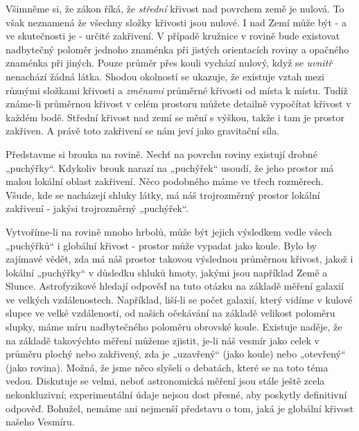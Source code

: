     Všimněme si, že zákon říká, že \emph{střední} křivost nad povrchem země je nulová. To však 
    neznamená že všechny složky křivosti jsou nulové. I nad Zemí může být - a ve skutečnosti je - 
    určité zakřivení. V případě kružnice v rovině bude existovat nadbytečný poloměr jednoho 
    znaménka při jistých orientacích roviny a opačného znaménka při jiných. Pouze průměr přes kouli 
    vychází nulový, když se \emph{uvnitř} nenachází žádná látka. Shodou okolností se ukazuje, že 
    existuje vztah mezi různými složkami křivosti a \emph{změnami} průměrné křivosti od místa k 
    místu. Tudíž známe-li průměrnou křivost v celém prostoru můžete detailně vypočítat křivost v 
    každém bodě. Střední křivost nad zemí se mění s výškou, takže i tam je prostor zakřiven. A 
    právě toto zakřivení se nám jeví jako gravitační síla. 
    
    Představme si brouka na rovině. Nechť na povrchu roviny existují drobné „puchýřky“. Kdykoliv 
    brouk narazí na „puchýřek“ usoudí, že jeho prostor má malou lokální oblast zakřivení. Něco 
    podobného máme ve třech rozměrech. Všude, kde se nacházejí shluky látky, má náš trojrozměrný 
    prostor lokální zakřivení - jakýsi trojrozměrný „puchýřek“. 
    
    Vytvoříme-li na rovině mnoho hrbolů, může být jejich výsledkem vedle všech „puchýřků“ i 
    globální křivost - prostor může vypadat jako koule. Bylo by zajímavé vědět, zda má náš prostor 
    takovou výslednou průměrnou křivost, jakož i lokální „puchýřky“ v důsledku shluků hmoty, jakými 
    jsou například Země a Slunce. Astrofyzikové hledají odpověď na tuto otázku na základě měření 
    galaxií ve velkých vzdálenostech. Například, liší-li se počet galaxií, který vidíme v kulové 
    slupce ve velké vzdálenosti, od našich očekávání na základě velikost poloměru slupky, máme míru 
    nadbytečného poloměru obrovské koule. Existuje naděje, že na základě takovýchto měření můžeme 
    zjistit, je-li náš vesmír jako celek v průměru plochý nebo zakřivený, zda je „uzavřený“ (jako 
    koule) nebo „otevřený“ (jako rovina). Možná, že jsme něco slyšeli o debatách, které se na toto 
    téma vedou. Diskutuje se velmi, neboť astronomická měření jsou stále ještě zcela nekonkluzivní; 
    experimentální údaje nejsou dost přesné, aby poskytly definitivní odpověď. Bohužel, nemáme ani 
    nejmenší představu o tom, jaká je globální křivost našeho Vesmíru.
    
